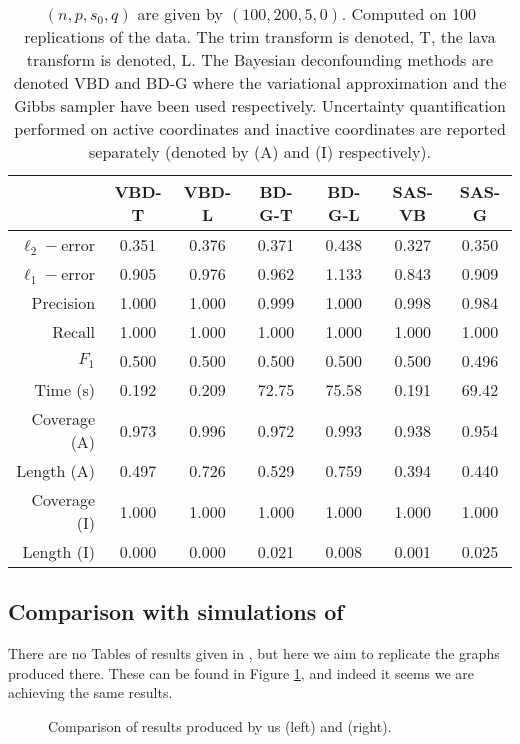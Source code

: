\documentclass[11pt]{article}
\numberwithin{equation}{section}
\begin{document}
\begin{table}[h]
\centering
\begin{tabular}{r|cc|cc|cc}
\toprule
               & VBD-T & VBD-L & BD-G-T & BD-G-L & SAS-VB & SAS-G \\ \hline
$\ell_2-$error & 0.351   & 0.376   & 0.371  & 0.438  & 0.327  & 0.350 \\
$\ell_1-$error & 0.905   & 0.976   & 0.962  & 1.133  & 0.843  & 0.909 \\ \hline
Precision      & 1.000   & 1.000   & 0.999  & 1.000  & 0.998  & 0.984 \\
Recall         & 1.000   & 1.000   & 1.000  & 1.000  & 1.000  & 1.000 \\
$F_1$          & 0.500   & 0.500   & 0.500  & 0.500  & 0.500  & 0.496 \\ \hline
Time (s)       & 0.192   & 0.209   & 72.75 & 75.58  & 0.191  & 69.42\\ \hline
Coverage (A)   & 0.973   & 0.996   & 0.972  & 0.993  & 0.938  & 0.954 \\
Length (A)     & 0.497   & 0.726   & 0.529  & 0.759  & 0.394  & 0.440 \\ \hline
Coverage (I)   & 1.000   & 1.000   & 1.000  & 1.000  & 1.000  & 1.000 \\
Length (I)     & 0.000   & 0.000   & 0.021  & 0.008  & 0.001  & 0.025 \\
\bottomrule
\end{tabular}
\caption{$(n, p, s_0, q) $ are given by $(100, 200, 5, 0)$. Computed on 100  replications of the data. The trim transform is denoted, T, the lava transform is denoted, L. The Bayesian deconfounding methods are denoted VBD and BD-G where the variational approximation and the Gibbs sampler have been used respectively. Uncertainty quantification performed on active coordinates and inactive coordinates are reported separately (denoted by (A) and (I) respectively).}
\label{Tab:UQ_no_confounding}
\end{table}

\subsection{Comparison with simulations of \cite{CBM2020}}
There are no Tables of results given in \cite{CBM2020}, but here we aim to replicate the graphs produced there. These can be found in Figure \ref{fig:cbm_comp_1}, and indeed it seems we are achieving the same results.

\begin{figure}[h]
\centering
{}
  \hspace{0mm}
  \caption{Comparison of results produced by us (left) and \cite{CBM2020} (right).}
  \label{fig:cbm_comp_1}
\end{figure}
\end{document}
